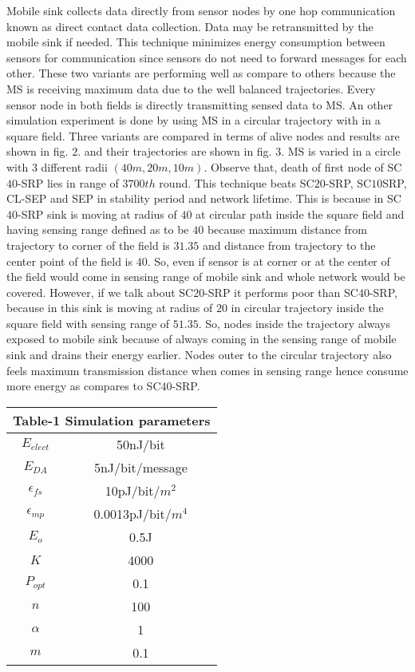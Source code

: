\documentclass{article}
\begin{document}
Mobile sink collects data directly from sensor nodes by one hop communication known as direct contact data collection. Data may be retransmitted by the mobile sink if needed. This technique minimizes energy consumption between sensors for communication since sensors do not need to forward messages for each other. These two variants are performing well as compare to others because the MS is receiving maximum data due to the well balanced trajectories. Every sensor node in both fields is directly transmitting sensed data to MS. An other simulation experiment is done by using MS in a circular trajectory with in a square field. Three variants are compared in terms of alive nodes and results are shown in fig. $2$. and their trajectories are shown in fig. $3$. MS is varied in a circle with $3$ different radii $(40m, 20m, 10m)$. Observe that, death of first node of SC$40$-SRP lies in range of $3700th$ round. This technique beats SC$20$-SRP, SC$10$SRP, CL-SEP and SEP in stability period and network lifetime. This is because in SC$40$-SRP sink is moving at radius of $40$ at circular path inside the square field and having sensing range defined as to be $40$ because maximum distance from trajectory to corner of the field is $31.35$ and distance from trajectory to the center point of the field is $40$. So, even if sensor is at corner or at the center of the field would come in sensing range of mobile sink and whole network would be covered. However, if we talk about SC$20$-SRP it performs poor than SC$40$-SRP, because in this sink is moving at radius of $20$ in circular trajectory inside the square field with sensing range of $51.35$. So, nodes inside the trajectory always exposed to mobile sink because of always coming in the sensing range of mobile sink and drains their energy earlier. Nodes outer to the circular trajectory also feels maximum transmission distance when comes in sensing range hence consume more energy as compares to SC$40$-SRP.

\begin{table}[ht]
\centering
\begin{tabular}{|c |c |} \multicolumn{2}{c}{Table-1 Simulation parameters}\\
\hline
$ E_{elect}$ & 50nJ/bit\\
\hline                  $E_{DA}$ & 5nJ/bit/message  \\
\hline
$\epsilon_{fs} $& 10pJ/bit/$m^2$  \\
\hline
 $\epsilon_{mp} $& 0.0013pJ/bit/$m^4$    \\
\hline
 $E_o$ & 0.5J \\
 \hline
 $K$ & 4000 \\
 \hline
 $P_{opt}$ & 0.1 \\
\hline
 $n$ & 100\\
 \hline
 $\alpha$ & 1 \\
 \hline
 $m$ & 0.1 \\
\hline
\end{tabular}
\end{table}
\end{document}
